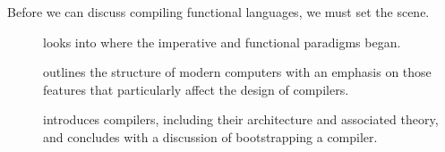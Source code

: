 
\label{background:overview}
Before we can discuss compiling functional languages, we must set the scene. 
\begin{description}
\item[] looks into where the imperative and functional paradigms began.
\item[] outlines the structure of modern computers with an emphasis on those features that particularly affect the design of compilers.
\item[] introduces compilers, %
including their architecture and associated theory, and concludes with a discussion of bootstrapping a compiler.
\end{description}